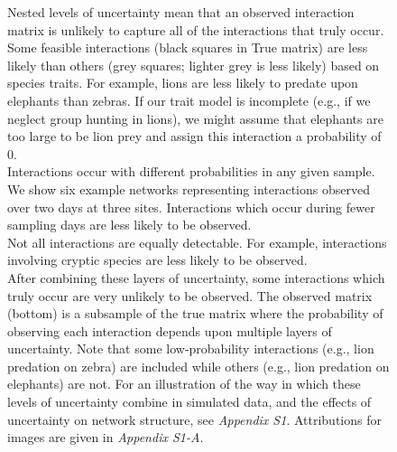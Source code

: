 \documentclass[12pt]{article}
\begin{document}
  \begin{figure}[h!]
    \caption{Nested levels of uncertainty mean that an observed interaction matrix is unlikely to capture all of the interactions that truly occur. Some feasible interactions (black squares in True matrix) are less likely than others (grey squares; lighter grey is less likely) based on species traits. For example, lions are less likely to predate upon elephants than zebras. If our trait model is incomplete (e.g., if we neglect group hunting in lions), we might assume that elephants are too large to be lion prey and assign this interaction a probability of 0.\\
    \indent Interactions occur with different probabilities in any given sample. We show six example networks representing interactions observed over two days at three sites. Interactions which occur during fewer sampling days are less likely to be observed.\\
    \indent Not all interactions are equally detectable. For example, interactions involving cryptic species are less likely to be observed.\\
    \indent After combining these layers of uncertainty, some interactions which truly occur are very unlikely to be observed. The observed matrix (bottom) is a subsample of the true matrix where the probability of observing each interaction depends upon multiple layers of uncertainty. Note that some low-probability interactions (e.g., lion predation on zebra) are included while others (e.g., lion predation on elephants) are not. For an illustration of the way in which these levels of uncertainty combine in simulated data, and the effects of uncertainty on network structure, see \emph{Appendix S1}. Attributions for images are given in \emph{Appendix S1-A}.}
    \label{conceptual_fig}
    \begin{center}

\end{center}
\end{figure}
\end{document}
